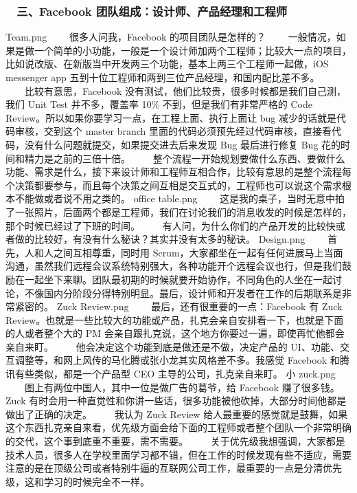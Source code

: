 \documentclass[11pt]{ctexart}
\begin{document}
\subsubsection{　三、Facebook 团队组成：设计师、产品经理和工程师}
\label{sec:orgheadline23}
Team.png
　　很多人问我，Facebook 的项目团队是怎样的？
　　一般情况，如果是做一个简单的小功能，一般是一个设计师加两个工程师；比较大一点的项目，比如说改版、在新版当中开发两三个功能，基本上两三个工程师一起做，iOS messenger app 五到十位工程师和两到三位产品经理，和国内配比差不多。
　　比较有意思，Facebook 没有测试，他们比较贵，很多时候都是我们自己测，我们 Unit Test 并不多，覆盖率 10\% 不到，但是我们有非常严格的 Code Review。所以如果你要学习一点，在工程上面、执行上面让 bug 减少的话就是代码审核，交到这个 master branch 里面的代码必须预先经过代码审核，直接看代码，没有什么问题就提交，如果提交进去后来发现 Bug 最后进行修复 Bug 花的时间和精力是之前的三倍十倍。
　　整个流程一开始规划要做什么东西、要做什么功能、需求是什么，接下来设计师和工程师互相合作，比较有意思的是整个流程每个决策都要参与，而且每个决策之间互相是交互式的，工程师也可以说这个需求根本不能做或者说不用之类的。
office table.png
　　这是我的桌子，当时无意中拍了一张照片，后面两个都是工程师，我们在讨论我们的消息收发的时候是怎样的，那个时候已经过了下班的时间。
　　有人问，为什么你们的产品开发的比较快或者做的比较好，有没有什么秘诀？其实并没有太多的秘诀。
Design.png
　　首先，人和人之间互相尊重，同时用 Scrum，大家都坐在一起有任何进展马上当面沟通，虽然我们远程会议系统特别强大，各种功能开个远程会议也行，但是我们鼓励在一起坐下来聊。团队最初期的时候就要开始协作，不同角色的人坐在一起讨论，不像国内分阶段分得特别明显。最后，设计师和开发者在工作的后期联系是非常紧密的。
Zuck Review.png
　　最后，还有很重要的一点：Facebook 有 Zuck Review。也就是一些比较大的功能或产品，扎克会亲自安排看一下，也就是下面的人或者整个大的 PM 会亲自跟扎克说，这个地方你要过一遍，即使再忙他都会亲自来盯。
　　他会决定这个功能到底是做还是不做，决定产品的 UI、功能、交互调整等，和网上风传的马化腾或张小龙其实风格差不多。我感觉 Facebook 和腾讯有些类似，都是一个产品型 CEO 主导的公司，扎克亲自来盯。
小 zuck.png
　　图上有两位中国人，其中一位是做广告的葛爷，给 Facebook 赚了很多钱。Zuck 有时会用一种直觉性和你讲一些话，很多功能被他砍掉，大部分时间他都是做出了正确的决定。
　　我认为 Zuck Review 给人最重要的感觉就是鼓舞，如果这个东西扎克亲自来看，优先级方面会给下面的工程师或者整个团队一个非常明确的交代，这个事到底重不重要，需不需要。
　　关于优先级我想强调，大家都是技术人员，很多人在学校里面学习都不错，但在工作的时候发现有些不适应，需要注意的是在顶级公司或者特别牛逼的互联网公司工作，最重要的一点是分清优先级，这和学习的时候完全不一样。
\end{document}
